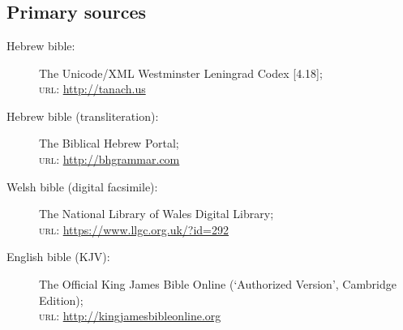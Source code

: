 \nocite{avrahami.y:2012:senses}
\nocite{levy.j:1967:translation}
\nocite{even-shoshan.a:1977:concordance}

\section*{\bibname}

\printbibliography[heading=none]

\subsection*{Primary sources}

\begin{description}
	\item [Hebrew bible:] The Unicode/XML Westminster Leningrad Codex [4.18];\\
		\textsc{url}: \url{http://tanach.us}
	\item [Hebrew bible (transliteration):] The Biblical Hebrew Portal;\\
		\textsc{url}: \url{http://bhgrammar.com}
	\item [Welsh bible (digital facsimile):] The National Library of Wales Digital Library;\\
		\textsc{url}: \url{https://www.llgc.org.uk/?id=292}
	\item [English bible (KJV):] The Official King James Bible Online (‘Authorized Version’, Cambridge Edition);\\
		\textsc{url}: \url{http://kingjamesbibleonline.org}
\end{description}
